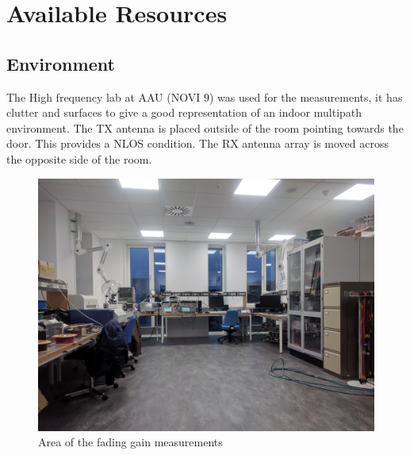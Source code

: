 \chapter{Available Resources}

\section{Environment} \label{Environment}
The High frequency lab at \gls{AAU} (NOVI 9) was used for the measurements, it has clutter and surfaces to give a good representation of an indoor multipath environment. The TX antenna is placed outside of the room pointing towards the door. This provides a NLOS condition. The RX antenna array is moved across the opposite side of the room.


\begin{figure}[H]
  \centering
  \begin{minipage}[H]{0.4\textwidth}
    \includegraphics[width=\textwidth]{pictures/Measurement/walking_meas.jpg}
    \caption{Area of the fading gain measurements}
    \label{walk_area}
  \end{minipage}
  \hfill
  \begin{minipage}[H]{0.5\textwidth}

\end{minipage}
\end{figure}
